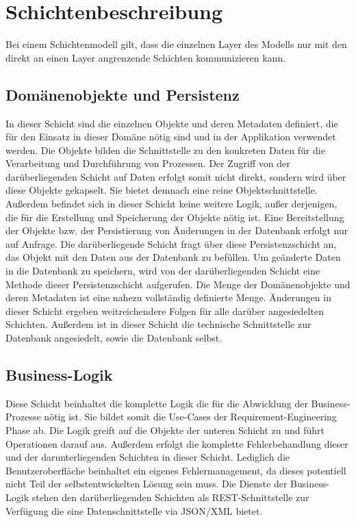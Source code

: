 \documentclass[a4paper,12pt]{article} %
\begin{document}
\section{Schichtenbeschreibung}
Bei einem Schichtenmodell gilt, dass die einzelnen Layer des Modells nur mit den direkt an einen Layer angrenzende Schichten kommunizieren kann.

\subsection{Domänenobjekte und Persistenz}
In dieser Schicht sind die einzelnen Objekte und deren Metadaten definiert, die für den Einsatz in dieser Domäne nötig sind und in der Applikation verwendet werden. Die Objekte bilden die Schnittstelle zu den konkreten Daten für die Verarbeitung und Durchführung von Prozessen. Der Zugriff von der darüberliegenden Schicht auf Daten erfolgt somit nicht direkt, sondern wird über diese Objekte gekapselt. Sie bietet demnach eine reine Objektschnittstelle. Außerdem befindet sich in dieser Schicht keine weitere Logik, außer derjenigen, die für die Erstellung und Speicherung der Objekte nötig ist.\newline
Eine Bereitstellung der Objekte bzw. der Persistierung von Änderungen in der Datenbank erfolgt nur auf Anfrage. Die darüberliegende Schicht fragt über diese Persistenzschicht an, das Objekt mit den Daten aus der Datenbank zu befüllen. Um geänderte Daten in die Datenbank zu speichern, wird von der darüberliegenden Schicht eine Methode dieser Persistenzschicht aufgerufen.\newline
Die Menge der Domänenobjekte und deren Metadaten ist eine nahezu vollständig definierte Menge. Änderungen in dieser Schicht ergeben weitreichendere Folgen für alle darüber angesiedelten Schichten. Außerdem ist in dieser Schicht die technische Schnittstelle zur Datenbank angesiedelt, sowie die Datenbank selbst.

\subsection{Business-Logik}
Diese Schicht beinhaltet die komplette Logik die für die Abwicklung der Business-Prozesse nötig ist. Sie bildet somit die Use-Cases der Requirement-Engineering Phase ab. Die Logik greift auf die Objekte der unteren Schicht zu und führt Operationen darauf aus. Außerdem erfolgt die komplette Fehlerbehandlung dieser und der darunterliegenden Schichten in dieser Schicht. Lediglich die Benutzeroberfläche beinhaltet ein eigenes Fehlermanagement, da dieses potentiell nicht Teil der selbstentwickelten Lösung sein muss. Die Dienste der Business-Logik stehen den darüberliegenden Schichten als REST-Schnittstelle zur Verfügung die eine Datenschnittstelle via JSON/XML bietet.
\end{document}
